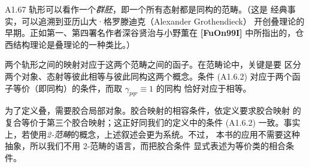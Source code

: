 \begin{remark}{A1.67}\label{rem:a1-67}
轨形可以看作一个\emph{群胚}，即一个所有态射都是同构的范畴。（这是
经典事实，可以追溯到亚历山大·格罗滕迪克（Alexander Grothendieck）
开创叠理论的早期。正如第一、第四署名作者深谷贤治与小野薫在
\textbf{[FuOn99I]} 中所指出的，仓西结构理论是叠理论的一种类比。）

两个轨形之间的映射对应于这两个范畴之间的函子。在范畴论中，关键是要
区分两个对象、态射等彼此相等与彼此同构这两个概念。条件 (A1.6.2)
对应于两个函子等价（即同构）的条件，而取 $\gamma_{pqr}\equiv1$ 的同构
恰好对应于相等。

为了定义叠，需要胶合局部对象。胶合映射的相容条件，依定义要求胶合映射
的复合等价于第三个胶合映射；这正好同我们的定义中的条件 (A1.6.2)
一致。事实上，若使用\emph{2-范畴}的概念，上述叙述会更为系统。不过，
本书的应用不需要这种抽象，所以我们不用 2-范畴的语言，而把胶合条件
显式表述为等价类的相合条件。
\end{remark}
